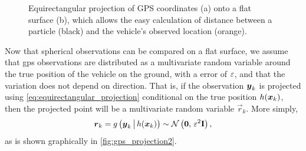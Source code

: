 \begin{knitrout}\small
{}\color{fgcolor}\begin{figure}

{\centering {}

}

\caption[Equirectangular projection of GPS coordinates onto a flat surface]{Equirectangular projection of GPS coordinates ({\sc a}) onto a flat surface ({\sc b}), which allows the easy calculation of distance between a particle (black) and the vehicle's observed location (orange).}\label{fig:gps_projection}
\end{figure}


\end{knitrout}


Now that spherical observations can be compared on a flat surface, we assume that \gls{gps} observations are distributed as a multivariate \normal{} random variable around the true position of the vehicle on the ground, with a \GPS{} error of $\varepsilon$, and that the variation does not depend on direction. That is, if the observation $\boldsymbol{y}_k$ is projected using \cref{eq:equirectangular_projection} conditional on the true position $h(\boldsymbol x_k)$, then the projected point will be a multivariate random variable $\vec{r}_k$. More simply,
\begin{equation}
\label{eq:gps_error_model}
\boldsymbol{r}_k = g\left(\boldsymbol{y}_k\,\big|\,{}h(\boldsymbol x_k)\right)
\sim \mathcal{N}\left(\boldsymbol{0},\, \varepsilon^2 \mathbf{I}\right),
\end{equation}
as is shown graphically in \cref{fig:gps_projection2}.




